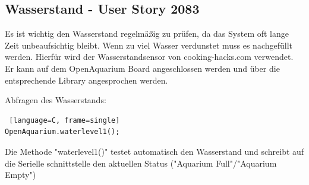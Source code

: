 \documentclass[11pt]{article}
\begin{document}
\subsection{Wasserstand - User Story 2083}
Es ist wichtig den Wasserstand regelmäßig zu prüfen, da das System oft lange Zeit unbeaufsichtig bleibt. Wenn zu viel Wasser verdunstet muss es nachgefüllt werden. Hierfür wird der Wasserstandsensor von cooking-hacks.com verwendet. Er kann auf dem OpenAquarium Board angeschlossen werden und über die entsprechende Library angesprochen werden. \\
\begin{minipage}{5in}
  \centering
\end{minipage}
Abfragen des Wasserstands:
\begin{lstlisting} [language=C, frame=single]
OpenAquarium.waterlevel1();
\end{lstlisting}
Die Methode "waterlevel1()" testet automatisch den Wasserstand und schreibt auf die Serielle schnittstelle den aktuellen Status ("Aquarium Full"/"Aquarium Empty")
\end{document}

